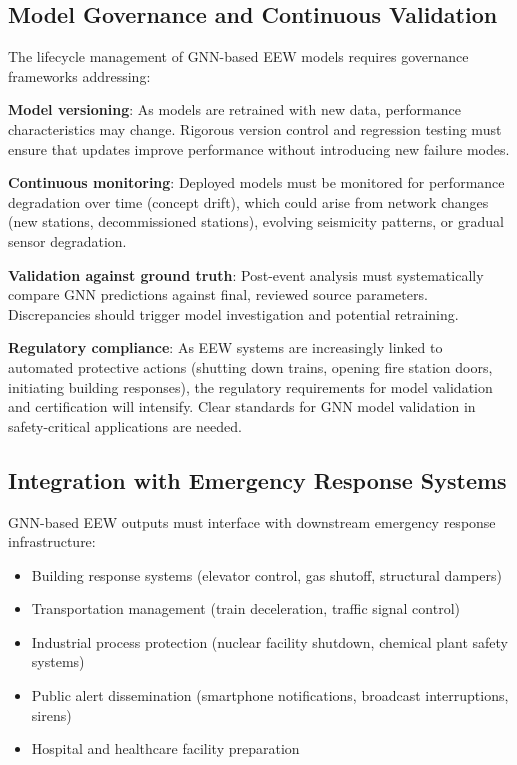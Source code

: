 \documentclass[review,authoryear]{elsarticle}
\begin{document}
\subsection{Model Governance and Continuous Validation}

The lifecycle management of GNN-based EEW models requires governance frameworks addressing:

\textbf{Model versioning}: As models are retrained with new data, performance characteristics may change. Rigorous version control and regression testing must ensure that updates improve performance without introducing new failure modes.

\textbf{Continuous monitoring}: Deployed models must be monitored for performance degradation over time (concept drift), which could arise from network changes (new stations, decommissioned stations), evolving seismicity patterns, or gradual sensor degradation.

\textbf{Validation against ground truth}: Post-event analysis must systematically compare GNN predictions against final, reviewed source parameters. Discrepancies should trigger model investigation and potential retraining.

\textbf{Regulatory compliance}: As EEW systems are increasingly linked to automated protective actions (shutting down trains, opening fire station doors, initiating building responses), the regulatory requirements for model validation and certification will intensify. Clear standards for GNN model validation in safety-critical applications are needed.

\subsection{Integration with Emergency Response Systems}

GNN-based EEW outputs must interface with downstream emergency response infrastructure:

\begin{itemize}
  \item Building response systems (elevator control, gas shutoff, structural dampers)
  \item Transportation management (train deceleration, traffic signal control)
  \item Industrial process protection (nuclear facility shutdown, chemical plant safety systems)
  \item Public alert dissemination (smartphone notifications, broadcast interruptions, sirens)
  \item Hospital and healthcare facility preparation
\end{itemize}
\end{document}
